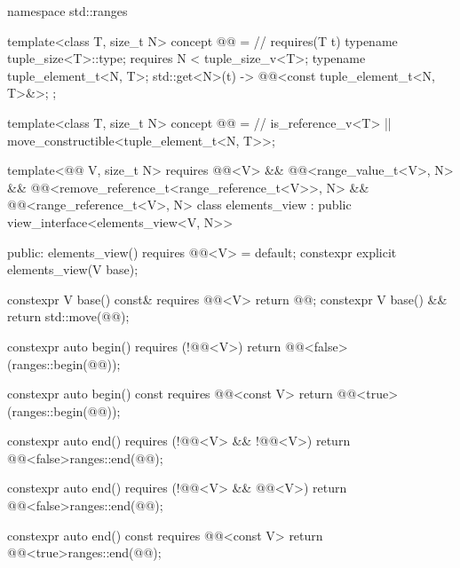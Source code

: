 %
%
%
%
%
\begin{codeblock}
namespace std::ranges {
  template<class T, size_t N>
  concept @@ =                   // \expos
    requires(T t) {
      typename tuple_size<T>::type;
      requires N < tuple_size_v<T>;
      typename tuple_element_t<N, T>;
      { std::get<N>(t) } -> @@<const tuple_element_t<N, T>&>;
    };

  template<class T, size_t N>
  concept @@ =                  // \expos
    is_reference_v<T> || move_constructible<tuple_element_t<N, T>>;

  template<@@ V, size_t N>
    requires @@<V> && @@<range_value_t<V>, N> &&
             @@<remove_reference_t<range_reference_t<V>>, N> &&
             @@<range_reference_t<V>, N>
  class elements_view : public view_interface<elements_view<V, N>> {
  public:
    elements_view() requires @@<V> = default;
    constexpr explicit elements_view(V base);

    constexpr V base() const& requires @@<V> { return @@; }
    constexpr V base() && { return std::move(@@); }

    constexpr auto begin() requires (!@@<V>)
    { return @@<false>(ranges::begin(@@)); }

    constexpr auto begin() const requires @@<const V>
    { return @@<true>(ranges::begin(@@)); }

    constexpr auto end() requires (!@@<V> && !@@<V>)
    { return @@<false>{ranges::end(@@)}; }

    constexpr auto end() requires (!@@<V> && @@<V>)
    { return @@<false>{ranges::end(@@)}; }

    constexpr auto end() const requires @@<const V>
    { return @@<true>{ranges::end(@@)}; }

}}
\end{codeblock}
